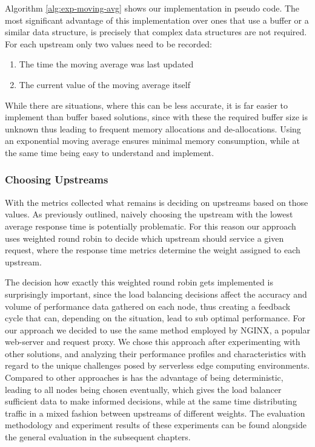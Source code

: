 

Algorithm \ref{alg:exp-moving-avg} shows our implementation in pseudo code.
The most significant advantage of this implementation over ones that use a buffer or a similar data structure, is precisely that complex data structures are not required. For each upstream only two values need to be recorded:
\begin{enumerate}
    \item The time the moving average was last updated
    \item The current value of the moving average itself
\end{enumerate}
While there are situations, where this can be less accurate, it is far easier to implement than buffer based solutions, since with these the required buffer size is unknown thus leading to frequent memory allocations and de-allocations.
Using an exponential moving average ensures minimal memory consumption, while at the same time being easy to understand and implement.

\subsubsection{Choosing Upstreams}
With the metrics collected what remains is deciding on upstreams based on those values. As previously outlined, naively choosing the upstream with the lowest average response time is potentially problematic.
For this reason our approach uses weighted round robin to decide which upstream should service a given request, where the response time metrics determine the weight assigned to each upstream.

The decision how exactly this weighted round robin gets implemented is surprisingly important, since the load balancing decisions affect the accuracy and volume of performance data gathered on each node, thus creating a feedback cycle that can, depending on the situation, lead to sub optimal performance.
For our approach we decided to use the same method employed by NGINX\cite{nginx}, a popular web-server and request proxy.
We chose this approach after experimenting with other solutions, and analyzing their performance profiles and characteristics with regard to the unique challenges posed by serverless edge computing environments.
Compared to other approaches is has the advantage of being deterministic, leading to all nodes being chosen eventually, which gives the load balancer sufficient data to make informed decisions, while at the same time distributing traffic in a mixed fashion between upstreams of different weights.
The evaluation methodology and experiment results of these experiments can be found alongside the general evaluation in the subsequent chapters.

